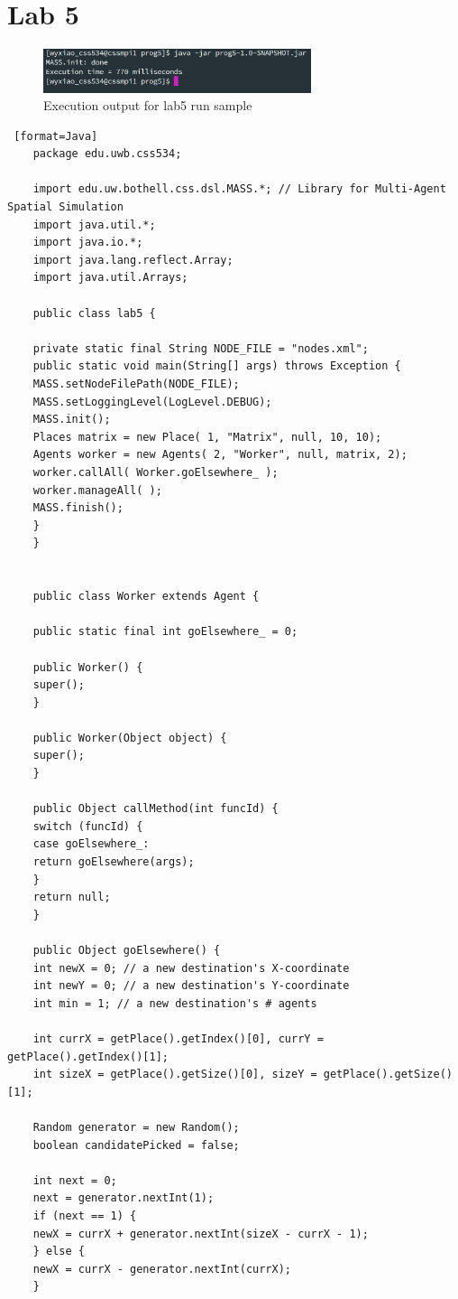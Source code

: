 \documentclass[11pt, letterpaper]{article}
\begin{document}
	\section {Lab 5}
	
	\begin{figure}[H]
		\centering
		\includegraphics[width=0.7\textwidth]{lab1}
		\caption{Execution output for lab5 run sample}
	\end{figure}

	\begin{lstlisting} [format=Java]
	package edu.uwb.css534;
	
	import edu.uw.bothell.css.dsl.MASS.*; // Library for Multi-Agent Spatial Simulation
	import java.util.*;
	import java.io.*;
	import java.lang.reflect.Array;
	import java.util.Arrays;
	
	public class lab5 {
	
	private static final String NODE_FILE = "nodes.xml";
	public static void main(String[] args) throws Exception {
	MASS.setNodeFilePath(NODE_FILE);
	MASS.setLoggingLevel(LogLevel.DEBUG);
	MASS.init();
	Places matrix = new Place( 1, "Matrix", null, 10, 10);
	Agents worker = new Agents( 2, "Worker", null, matrix, 2);
	worker.callAll( Worker.goElsewhere_ );
	worker.manageAll( );
	MASS.finish();
	}
	}
	
	
	public class Worker extends Agent {
	
	public static final int goElsewhere_ = 0;
	
	public Worker() {
	super();
	}
	
	public Worker(Object object) {
	super();
	}
	
	public Object callMethod(int funcId) {
	switch (funcId) {
	case goElsewhere_:
	return goElsewhere(args);
	}
	return null;
	}
	
	public Object goElsewhere() {
	int newX = 0; // a new destination's X-coordinate
	int newY = 0; // a new destination's Y-coordinate
	int min = 1; // a new destination's # agents
	
	int currX = getPlace().getIndex()[0], currY = getPlace().getIndex()[1];
	int sizeX = getPlace().getSize()[0], sizeY = getPlace().getSize()[1];
	
	Random generator = new Random();
	boolean candidatePicked = false;
	
	int next = 0;
	next = generator.nextInt(1);
	if (next == 1) {
	newX = currX + generator.nextInt(sizeX - currX - 1);
	} else {
	newX = currX - generator.nextInt(currX);
	}
	

\end{lstlisting}
\end{document}
